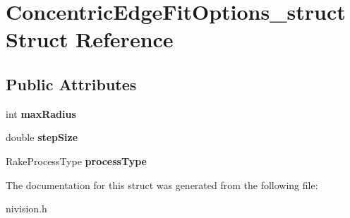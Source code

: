\hypertarget{structConcentricEdgeFitOptions__struct}{
\section{ConcentricEdgeFitOptions\_\-struct Struct Reference}
\label{structConcentricEdgeFitOptions__struct}
}
\subsection*{Public Attributes}
\begin{DoxyCompactItemize}
\item 
\hypertarget{structConcentricEdgeFitOptions__struct_aab14583e2ef9cef33ed37455c255500b}{
int {\bfseries maxRadius}}
\label{structConcentricEdgeFitOptions__struct_aab14583e2ef9cef33ed37455c255500b}

\item 
\hypertarget{structConcentricEdgeFitOptions__struct_adab39c6e17abd2abbcf6b044fe53f9f8}{
double {\bfseries stepSize}}
\label{structConcentricEdgeFitOptions__struct_adab39c6e17abd2abbcf6b044fe53f9f8}

\item 
\hypertarget{structConcentricEdgeFitOptions__struct_a41bacb2f53fa745c199b3eb38a4afcdf}{
RakeProcessType {\bfseries processType}}
\label{structConcentricEdgeFitOptions__struct_a41bacb2f53fa745c199b3eb38a4afcdf}

\end{DoxyCompactItemize}


The documentation for this struct was generated from the following file:\begin{DoxyCompactItemize}
\item 
nivision.h\end{DoxyCompactItemize}
